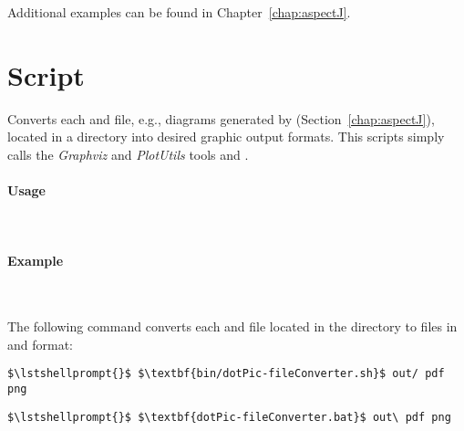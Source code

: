 \noindent Additional examples can be found in Chapter~\ref{chap:aspectJ}.

\section{Script }\label{appendix:wrapperScripts:dotPicFileConverter}

Converts each  and  file, e.g., diagrams generated by %
\KickerTraceAnalysis{} (Section~\ref{chap:aspectJ}), located in a directory %
into desired graphic output formats. %
This scripts simply calls the \textit{Graphviz} and \textit{PlotUtils} tools  and .

\paragraph*{Usage}\

\setTextListing


\paragraph*{Example}\

\noindent The following command converts each  and  file located in the %
directory  to files in  and  format:

\setTextListing
\begin{lstlisting}[caption=Execution under UNIX-like systems]
$\lstshellprompt{}$ $\textbf{bin/dotPic-fileConverter.sh}$ out/ pdf png
\end{lstlisting}
\begin{lstlisting}[caption=Execution under Windows]
$\lstshellprompt{}$ $\textbf{dotPic-fileConverter.bat}$ out\ pdf png
\end{lstlisting}